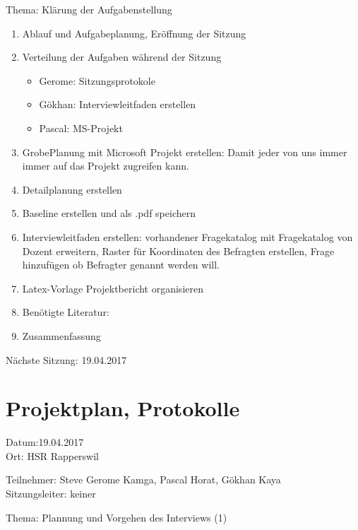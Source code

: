 Thema: Klärung der Aufgabenstellung
\begin{enumerate}

\item Ablauf und Aufgabeplanung, Eröffnung der Sitzung 

\item  Verteilung der Aufgaben während der Sitzung
\begin{itemize}
\item Gerome: Sitzungsprotokole
\item Gökhan: Interviewleitfaden erstellen
\item Pascal: MS-Projekt
\end{itemize}

\item GrobePlanung mit Microsoft Projekt erstellen: Damit jeder von uns immer immer auf das Projekt zugreifen kann.

\item Detailplanung erstellen

\item Baseline erstellen und als .pdf speichern

\item Interviewleitfaden erstellen: vorhandener Fragekatalog mit Fragekatalog von Dozent erweitern, Raster für Koordinaten des Befragten erstellen, Frage hinzufügen ob Befragter genannt werden will.

\item Latex-Vorlage Projektbericht organisieren

\item Benötigte Literatur: 

\item Zusammenfassung

\end{enumerate}

Nächste Sitzung: 19.04.2017

\newpage
\section*{Projektplan, Protokolle}

Datum:19.04.2017\\
Ort: HSR Rapperswil

Teilnehmer: Steve Gerome Kamga, Pascal Horat, Gökhan Kaya\\
Sitzungsleiter: keiner

Thema: Plannung und Vorgehen des Interviews (1)

